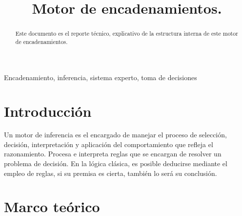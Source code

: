 \documentclass[conference]{IEEEtran}
\begin{document}
\renewcommand\IEEEkeywordsname{Palabras clave}

{\footnotesize 
\title{Motor de encadenamientos.}
}

\author{
\and
{}
\and
{}
}

\maketitle

\begin{abstract}
Este documento es el reporte técnico, explicativo de la estructura interna de este motor de encadenamientos.
\end{abstract}

\begin{IEEEkeywords}
Encadenamiento, inferencia, sistema experto, toma de decisiones
\end{IEEEkeywords}

\section{Introducción}
Un motor de inferencia es el encargado de manejar el proceso de selección, decisión, 
interpretación y aplicación del comportamiento que refleja el razonamiento.
 Procesa e interpreta reglas que se encargan de resolver un problema de decisión. 
 En la lógica clásica, es posible deducirse mediante el empleo de reglas, si su premisa es 
 cierta, también lo será su conclusión. 
\section{Marco teórico}
\end{document}
